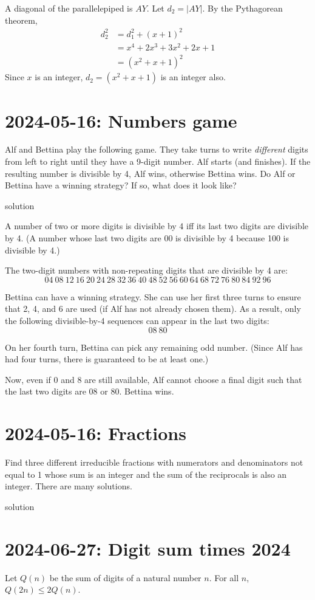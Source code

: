 \documentclass[11pt, oneside]{amsart}
\newcommand{\problem}[2]{\section*{#1: #2}}
\newcommand{\solution}[0]{{\sc solution}}
\begin{document}
A diagonal of the parallelepiped is $AY$. Let $d_2 = |AY|$.
By the Pythagorean theorem,
\begin{align*}
	 d_2^2 &= d_1^2 + (x+1)^2 \\
           &= x^4 + 2x^3 + 3x^2 + 2x + 1 \\
           &= (x^2 + x + 1)^2
\end{align*}
Since $x$ is an integer, $d_2 = (x^2 + x +1)$ is an integer also.

\newpage
\problem{2024-05-16}{Numbers game}

Alf and Bettina play the following game. They take turns to write {\em different} digits
from left to right until they have a 9-digit number. Alf starts (and finishes). If the resulting number is divisible by 4, Alf wins, otherwise Bettina wins.
Do Alf or Bettina have a winning strategy? If so, what does it look like?

\solution

A number of two or more digits is divisible by 4 iff its last two digits
are divisible by 4. (A number whose last two digits are $00$ is divisible by
4 because 100 is divisible by 4.)

The two-digit numbers with non-repeating digits that are divisible by 4 are:
\[ 04~08~12~16~20~24~28~32~36~40~48~52~56~60~64~68~72~76~80~84~92~96 \]

Bettina can have a winning strategy. She can use her first three turns
to ensure that 2, 4, and 6 are used (if Alf has not already chosen
them). As a result, only the following divisible-by-4 sequences can appear
in the last two digits:
\[ 08~80 \]

On her fourth turn, Bettina can pick any remaining odd number. (Since Alf
has had four turns, there is guaranteed to be at least one.)

Now, even if 0 and 8 are still available, Alf cannot choose a final digit
such that the last two digits are 08 or 80. Bettina wins.

\newpage
\problem{2024-05-16}{Fractions}

Find three different irreducible fractions with numerators and denominators
not equal to 1 whose sum is an integer and the sum of the reciprocals is
also an integer. There are many solutions.

\solution

\newpage
\problem{2024-06-27}{Digit sum times 2024}

Let $Q(n)$ be the sum of digits of a natural number $n$. For all $n$, $Q(2n) \leq 2Q(n)$.
\end{document}
